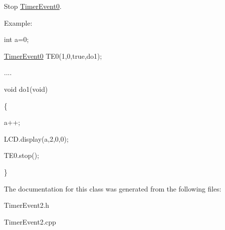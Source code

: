 \label{class_timer_event2_a4cdefad3e8b4bc89911137b60f4db9d6}
\par
Stop \hyperlink{class_timer_event0}{TimerEvent0}.\par
 \par
Example:\par
\par
 int a=0; \par
 \hyperlink{class_timer_event0}{TimerEvent0} TE0(1,0,true,do1);\par
 .... \par
 void do1(void)\par
 \{ \par
 a++; \par
 LCD.display(a,2,0,0);\par
 TE0.stop(); \par
 \}\par
 

The documentation for this class was generated from the following files:\begin{DoxyCompactItemize}
\item 
TimerEvent2.h\item 
TimerEvent2.cpp\end{DoxyCompactItemize}
